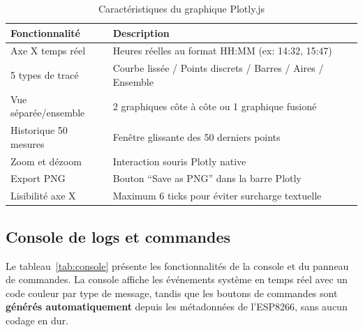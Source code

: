 \documentclass[12pt, a4paper]{report}
\begin{document}
\begin{table}[H]
\centering
\renewcommand{\arraystretch}{1.3}
\begin{tabularx}{\linewidth}{|l|X|}
\hline
\rowcolor{bleuFonce!10}
\textbf{Fonctionnalit\'e} & \textbf{Description} \\
\hline
Axe X temps r\'eel &
  Heures r\'eelles au format HH:MM (ex: 14:32, 15:47) \\
\hline
5 types de trac\'e &
  Courbe liss\'ee / Points discrets / Barres / Aires / Ensemble \\
\hline
Vue s\'epar\'ee/ensemble &
  2 graphiques c\^ote \`a c\^ote ou 1 graphique fusion\'e \\
\hline
Historique 50 mesures &
  Fen\^etre glissante des 50 derniers points \\
\hline
Zoom et d\'ezoom & Interaction souris Plotly native \\
\hline
Export PNG & Bouton ``Save as PNG'' dans la barre Plotly \\
\hline
Lisibilit\'e axe X &
  Maximum 6 ticks pour \'eviter surcharge textuelle \\
\hline
\end{tabularx}
\caption{Caract\'eristiques du graphique Plotly.js}
\label{tab:plotly}
\end{table}

\subsection{Console de logs et commandes}

Le tableau~\ref{tab:console} pr\'esente les fonctionnalit\'es de la
console et du panneau de commandes. La console affiche les
\'ev\'enements syst\`eme en temps r\'eel avec un code couleur par
type de message, tandis que les boutons de commandes sont
\textbf{g\'en\'er\'es automatiquement} depuis les m\'etadonn\'ees de
l'ESP8266, sans aucun codage en dur.
\end{document}
